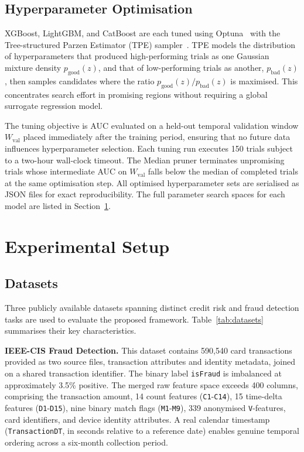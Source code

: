 \documentclass[pdflatex,sn-mathphys-num]{sn-jnl}
\theoremstyle{thmstyleone}
\theoremstyle{thmstyletwo}
\theoremstyle{thmstylethree}
\begin{document}
\subsection{Hyperparameter Optimisation}\label{sec:method:optuna}

XGBoost, LightGBM, and CatBoost are each tuned using
Optuna~\cite{akiba2019optuna} with the Tree-structured Parzen Estimator (TPE)
sampler~\cite{bergstra2011tpe}. TPE
models the distribution of hyperparameters that produced high-performing trials
as one Gaussian mixture density $p_{\mathrm{good}}(z)$, and that of
low-performing trials as another, $p_{\mathrm{bad}}(z)$, then samples
candidates where the ratio $p_{\mathrm{good}}(z)/p_{\mathrm{bad}}(z)$ is
maximised. This concentrates search effort in promising regions without
requiring a global surrogate regression model.

The tuning objective is AUC evaluated on a held-out temporal validation window
$W_{\mathrm{val}}$ placed immediately after the training period, ensuring that
no future data influences hyperparameter selection. Each tuning run executes
150 trials subject to a two-hour wall-clock timeout. The Median pruner
terminates unpromising trials whose intermediate AUC on $W_{\mathrm{val}}$
falls below the median of completed trials at the same optimisation step.
All optimised hyperparameter sets are serialised as JSON files for exact
reproducibility. The full parameter search spaces for each model are listed
in Section~\ref{sec:experiments}.


\section{Experimental Setup}\label{sec:experiments}

\subsection{Datasets}\label{sec:exp:data}

Three publicly available datasets spanning distinct credit risk and fraud
detection tasks are used to evaluate the proposed framework.
Table~\ref{tab:datasets} summarises their key characteristics.

\textbf{IEEE-CIS Fraud Detection.} This dataset contains 590,540 card
transactions provided as two source files, transaction attributes and identity
metadata, joined on a shared transaction identifier. The binary label
\texttt{isFraud} is imbalanced at approximately 3.5\% positive. The merged raw
feature space exceeds 400 columns, comprising the transaction amount, 14 count
features (\texttt{C1}-\texttt{C14}), 15 time-delta features (\texttt{D1}-\texttt{D15}),
nine binary match flags (\texttt{M1}-\texttt{M9}), 339 anonymised \texttt{V}-features,
card identifiers, and device identity attributes. A real calendar timestamp
(\texttt{TransactionDT}, in seconds relative to a reference date) enables
genuine temporal ordering across a six-month collection period.
\end{document}
